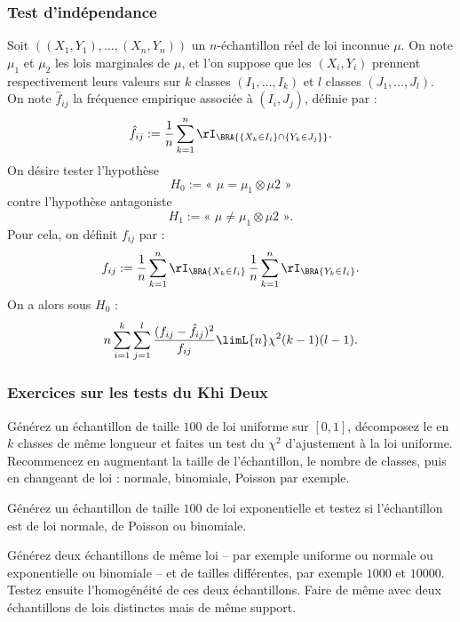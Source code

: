\subsubsection{Test d'indépendance}

Soit $((X_1,Y_1),\ldots,(X_n,Y_n))$ un $n$-échantillon réel de loi inconnue
$\mu$. On note $\mu_1$ et $\mu_2$ les lois marginales de $\mu$, et l'on
suppose que les $(X_i,Y_i)$ prennent respectivement leurs valeurs sur $k$
classes $(I_1,\ldots,I_k)$ et $l$ classes $(J_1,\ldots,J_l)$. On note $\hat
f_{ij}$ la fréquence empirique associée à $(I_i,J_j)$, définie par :
\begin{equation*}
  \hat f_{ij}
  :=\frac{1}{n}\sum_{k=1}^n \rI_\BRA{\{X_k \in I_i\}\cap\{Y_k \in J_j\}}.
\end{equation*}
On désire tester l'hypothèse
$$
H_0 := \text{« } \mu=\mu_1\otimes\mu2 \text{ »}
$$
contre l'hypothèse antagoniste
$$
H_1 := \text{« } \mu \neq \mu_1\otimes\mu2 \text{ »}.
$$
Pour cela, on définit $f_{ij}$ par :
\begin{equation*}
  f_{ij}:=
  \frac{1}{n}\sum_{k=1}^n\rI_\BRA{X_k \in I_i}
  \,
  \frac{1}{n}\sum_{k=1}^n\rI_\BRA{Y_k \in I_i}.
\end{equation*}
On a alors sous $H_0$ :
\begin{equation*}
  n\sum_{i=1}^k 
  \sum _{j=1}^l \frac{(f_{ij}-\hat f_{ij})^2}{f_{ij}} 
  \limL{n} \chi^2(k-1)(l-1).
\end{equation*}

\subsubsection{Exercices sur les tests du Khi Deux}

\begin{exo}
  Générez un échantillon de taille $100$ de loi uniforme sur $[0,1]$,
  décomposez le en $k$ classes de même longueur et faites un test du $\chi^2$
  d'ajustement à la loi uniforme. Recommencez en augmentant la taille de
  l'échantillon, le nombre de classes, puis en changeant de loi : normale,
  binomiale, Poisson par exemple.
\end{exo}

\begin{exo}
  Générez un échantillon de taille $100$ de loi exponentielle et testez si
  l'échantillon est de loi normale, de Poisson ou binomiale.
\end{exo}

\begin{exo}
  Générez deux échantillons de même loi -- par exemple uniforme ou normale ou
  exponentielle ou binomiale -- et de tailles différentes, par exemple $1000$ et
  $10000$. Testez ensuite l'homogénéité de ces deux échantillons. Faire de
  même avec deux échantillons de lois distinctes mais de même support.
\end{exo}

